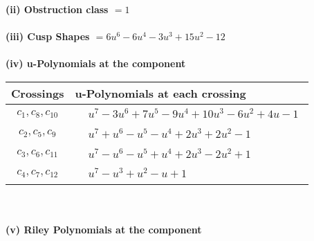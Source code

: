 \documentclass[1p]{elsarticle_modified}
\theoremstyle{definition}
\begin{document}
\flushleft \textbf{(ii) Obstruction class $= 1$}\\~\\
\flushleft \textbf{(iii) Cusp Shapes $= 6 u^6-6 u^4-3 u^3+15 u^2-12$}\\~\\
\newpage\renewcommand{\arraystretch}{1}
\flushleft \textbf{(iv) u-Polynomials at the component}\newline \\
\begin{tabular}{m{50pt}|m{274pt}}
Crossings & \hspace{64pt}u-Polynomials at each crossing \\
\hline $$\begin{aligned}c_{1},c_{8},c_{10}\end{aligned}$$&$\begin{aligned}
&u^7-3 u^6+7 u^5-9 u^4+10 u^3-6 u^2+4 u-1
\end{aligned}$\\
\hline $$\begin{aligned}c_{2},c_{5},c_{9}\end{aligned}$$&$\begin{aligned}
&u^7+u^6- u^5- u^4+2 u^3+2 u^2-1
\end{aligned}$\\
\hline $$\begin{aligned}c_{3},c_{6},c_{11}\end{aligned}$$&$\begin{aligned}
&u^7- u^6- u^5+u^4+2 u^3-2 u^2+1
\end{aligned}$\\
\hline $$\begin{aligned}c_{4},c_{7},c_{12}\end{aligned}$$&$\begin{aligned}
&u^7- u^3+u^2- u+1
\end{aligned}$\\
\hline
\end{tabular}\\~\\
\newpage\renewcommand{\arraystretch}{1}
\flushleft \textbf{(v) Riley Polynomials at the component}\newline \\
\end{document}
